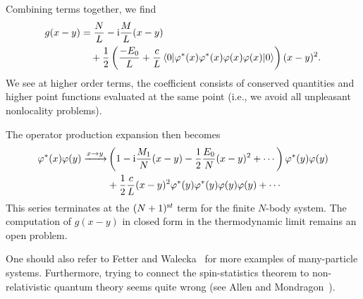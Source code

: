 Combining terms together, we find
\begin{equation}
\begin{split}
g(x-y)&=\frac{N}{L}-\mathrm{i}\frac{M}{L}(x-y)\\
&\quad+\frac{1}{2}\left(\frac{-E_{0}}{L}+\frac{c}{L}\braket{0|\varphi^{*}(x)\varphi^{*}(x)\varphi(x)\varphi(x)|0}\right)(x-y)^{2}.
\end{split}
\end{equation}
We see at higher order terms, the coefficient consists of conserved
quantities and higher point functions evaluated at the same point (i.e.,
we avoid all unpleasant nonlocality problems).

The operator production expansion then becomes
\begin{equation}
\begin{split}
\varphi^{*}(x)\varphi(y)\xrightarrow{x\to y}&
\left(1 - \mathrm{i}\frac{M_{1}}{N}(x-y)-\frac{1}{2}\frac{E_{0}}{N}(x-y)^{2}+\cdots\right)\varphi^{*}(y)\varphi(y)\\
&+\frac{1}{2}\frac{c}{L}(x-y)^{2}\varphi^{*}(y)\varphi^{*}(y)\varphi(y)\varphi(y)+\cdots
\end{split}
\end{equation}
This series terminates at the $(N+1)^{\text st}$ term for the finite
$N$-body system. The computation of $g(x-y)$ in closed form in the
thermodynamic limit remains an open problem.

One should also refer to Fetter and Walecka~\cite[Ch.\ 1]{fetter} 
for more examples of many-particle systems. Furthermore, trying to 
connect the spin-statistics theorem to non-relativistic quantum 
theory seems quite wrong (see Allen and Mondragon~\cite{allen2003ss}).
